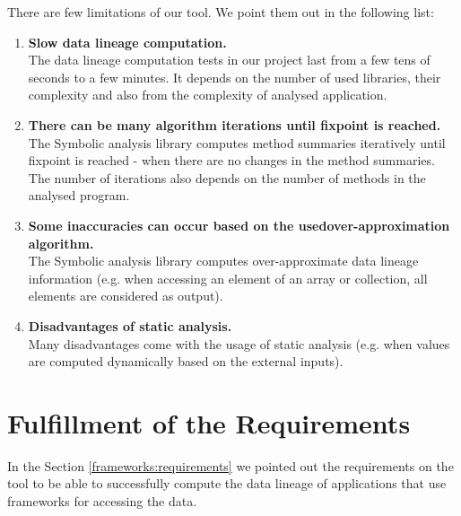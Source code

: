 There are few limitations of our \ToolName tool.
We point them out in the following list:
\begin{enumerate}
  \item \textbf{Slow data lineage computation.} \\
    The data lineage computation tests in our project last from
    a few tens of seconds to a few minutes. It depends on the
    number of used libraries, their complexity and also from the complexity
    of analysed application.
  \item \textbf{There can be many algorithm iterations until fixpoint is reached.} \\
    The Symbolic analysis library computes method summaries iteratively until
    fixpoint is reached - when there are no changes in the method summaries.
    The number of iterations also depends on the number of methods in the analysed program.
  \item \textbf{Some inaccuracies can occur based on the used\break over-approximation algorithm.} \\
    The Symbolic analysis library computes over-approximate data lineage information (e.g. when accessing
    an element of an array or collection, all elements are considered as output).
  \item \textbf{Disadvantages of static analysis.} \\
    Many disadvantages come with the usage of static analysis
    (e.g. when values are computed dynamically based on the external inputs).
\end{enumerate}



\section{Fulfillment of the Requirements}

In the Section \ref{frameworks:requirements} we pointed out the requirements
on the \ToolName tool to be able to successfully compute the data lineage of
applications that use frameworks for accessing the data.

